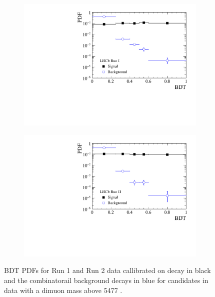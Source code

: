 \begin{figure}[htbp]
    \centering
   \begin{subfigure}[b]{0.48\textwidth}
        \includegraphics[width= \textwidth]{./Figs/BFAnalysis/C_macros/BDT_calibration_Run1.pdf}
    \end{subfigure}
    \begin{subfigure}[b]{0.48\textwidth}
       \includegraphics[width=\textwidth]{./Figs/BFAnalysis/C_macros/BDT_calibration_Run2.pdf}
   \end{subfigure}
    \caption{\bmumu BDT PDFs for Run 1 and Run 2 data callibrated on \bdkpi decay in black and the combinatorail background decays in blue for \bmumu candidates in data with a dimuon mass above 5477 \mevcc. }
    \label{fig:BDTPDFs}
\end{figure}


